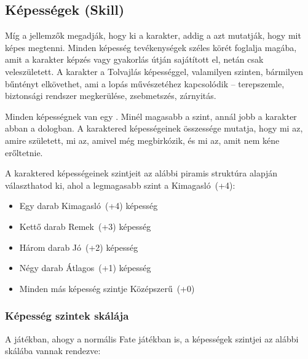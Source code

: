 \label{Képességek}
\subsection[Képességek]{Képességek (Skill)}

Míg a jellemzők megadják, hogy ki a karakter, addig a  azt mutatják, hogy mit képes megtenni. Minden képesség tevékenységek széles körét foglalja magába, amit a karakter képzés vagy gyakorlás útján sajátított el, netán csak veleszületett. A karakter a Tolvajlás képességgel, valamilyen szinten, bármilyen bűntényt elkövethet, ami a lopás művészetéhez kapcsolódik -- terepszemle, biztonsági rendszer megkerülése, zsebmetszés, zárnyitás.

Minden képességnek van egy . Minél magasabb a szint, annál jobb a karakter abban a dologban. A karaktered képességeinek összessége mutatja, hogy mi az, amire született, mi az, amivel még megbirkózik, és mi az, amit nem kéne erőltetnie.

A karaktered képességeinek szintjeit az alábbi piramis struktúra alapján választhatod ki, ahol a legmagasabb szint a Kimagasló~(+4):

\begin{itemize}
    \item Egy darab Kimagasló~(+4) képesség
    \item Kettő darab Remek~(+3) képesség
    \item Három darab Jó~(+2) képesség
    \item Négy darab Átlagos~(+1) képesség
    \item Minden más képesség szintje Középszerű~(+0)
\end{itemize}

\label{Képesség szintek skálája}
\subsubsection{Képesség szintek skálája}

A  játékban, ahogy a normális Fate játékban is, a képességek szintjei az alábbi skálába vannak rendezve:

\begin{center}
\end{center}
